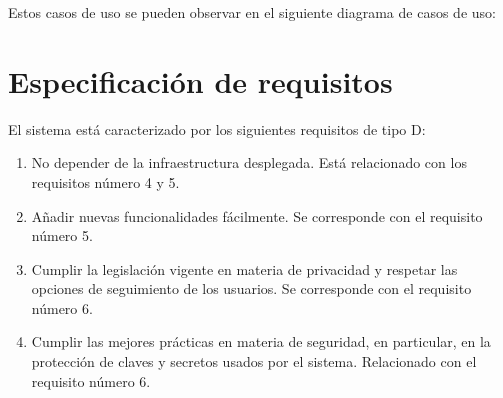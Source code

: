 Estos casos de uso se pueden observar en el siguiente diagrama de casos de uso:



\section{Especificación de requisitos}

El sistema está caracterizado por los siguientes requisitos de tipo \guillemotleft D\guillemotright:

\begin{enumerate}
    \item No depender de la infraestructura desplegada. Está relacionado con los requisitos número 4 y 5.
    \item Añadir nuevas funcionalidades fácilmente. Se corresponde con el requisito número 5.
    \item Cumplir la legislación vigente en materia de privacidad y respetar las opciones de seguimiento de los usuarios. Se corresponde con el requisito número 6.
    \item Cumplir las mejores prácticas en materia de seguridad, en particular, en la protección de claves y secretos usados por el sistema. Relacionado con el requisito número 6.
\end{enumerate}
